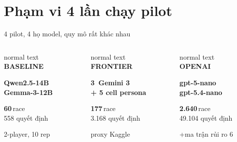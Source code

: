 \documentclass[9pt,aspectratio=169]{beamer}
\begin{document}
\section{Phạm vi 4 lần chạy pilot}

\begin{frame}{4 pilot, 4 họ model, quy mô rất khác nhau}
\centering
\begin{columns}[T,onlytextwidth]
\begin{beamercolorbox}[sep=.3cm,rounded=true]{normal text}
{\scriptsize\bfseries\color{deepblue} BASELINE}\par\vspace{4pt}
{\bfseries Qwen2.5-14B\\Gemma-3-12B}\par\vspace{6pt}
{\Large\bfseries\color{skyblue} 60}\,race\\
{\small\color{gray}558 quyết định}\par\vspace{4pt}
{\tiny 2-player, 10 rep}
\end{beamercolorbox}
\begin{beamercolorbox}[sep=.3cm,rounded=true]{normal text}
{\scriptsize\bfseries\color{deepblue} FRONTIER}\par\vspace{4pt}
{\bfseries 3\texttimes\ Gemini 3\\+ 5 cell persona}\par\vspace{6pt}
{\Large\bfseries\color{skyblue} 177}\,race\\
{\small\color{gray}3.168 quyết định}\par\vspace{4pt}
{\tiny proxy Kaggle}
\end{beamercolorbox}
\begin{beamercolorbox}[sep=.3cm,rounded=true]{normal text}
{\scriptsize\bfseries\color{deepblue} OPENAI}\par\vspace{4pt}
{\bfseries gpt-5-nano\\gpt-5.4-nano}\par\vspace{6pt}
{\Large\bfseries\color{skyblue} 2.640}\,race\\
{\small\color{gray}49.104 quyết định}\par\vspace{4pt}
{\tiny +ma trận rủi ro 6}

\end{beamercolorbox}
\end{columns}
\end{frame}
\end{document}

